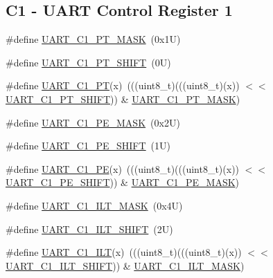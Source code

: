 \subsection*{C1 -\/ U\+A\+RT Control Register 1}
\begin{DoxyCompactItemize}
\item 
\#define \mbox{\hyperlink{group___u_a_r_t___register___masks_ga5a1c05b549b94de9232fbac665b3f584}{U\+A\+R\+T\+\_\+\+C1\+\_\+\+P\+T\+\_\+\+M\+A\+SK}}~(0x1\+U)
\item 
\#define \mbox{\hyperlink{group___u_a_r_t___register___masks_ga1638e7faa5063dab6afd34353fde4c89}{U\+A\+R\+T\+\_\+\+C1\+\_\+\+P\+T\+\_\+\+S\+H\+I\+FT}}~(0\+U)
\item 
\#define \mbox{\hyperlink{group___u_a_r_t___register___masks_gaf1c2f3c8a89397e4ccce509a2800250a}{U\+A\+R\+T\+\_\+\+C1\+\_\+\+PT}}(x)~(((uint8\+\_\+t)(((uint8\+\_\+t)(x)) $<$$<$ \mbox{\hyperlink{group___u_a_r_t___register___masks_ga1638e7faa5063dab6afd34353fde4c89}{U\+A\+R\+T\+\_\+\+C1\+\_\+\+P\+T\+\_\+\+S\+H\+I\+FT}})) \& \mbox{\hyperlink{group___u_a_r_t___register___masks_ga5a1c05b549b94de9232fbac665b3f584}{U\+A\+R\+T\+\_\+\+C1\+\_\+\+P\+T\+\_\+\+M\+A\+SK}})
\item 
\#define \mbox{\hyperlink{group___u_a_r_t___register___masks_ga0204f696872c2e5f92413bb11d0170d1}{U\+A\+R\+T\+\_\+\+C1\+\_\+\+P\+E\+\_\+\+M\+A\+SK}}~(0x2\+U)
\item 
\#define \mbox{\hyperlink{group___u_a_r_t___register___masks_ga1113f7bea6e6612fcc04db049d41cd1e}{U\+A\+R\+T\+\_\+\+C1\+\_\+\+P\+E\+\_\+\+S\+H\+I\+FT}}~(1\+U)
\item 
\#define \mbox{\hyperlink{group___u_a_r_t___register___masks_ga5aa3c8b737df2a5511d41513d4e4533f}{U\+A\+R\+T\+\_\+\+C1\+\_\+\+PE}}(x)~(((uint8\+\_\+t)(((uint8\+\_\+t)(x)) $<$$<$ \mbox{\hyperlink{group___u_a_r_t___register___masks_ga1113f7bea6e6612fcc04db049d41cd1e}{U\+A\+R\+T\+\_\+\+C1\+\_\+\+P\+E\+\_\+\+S\+H\+I\+FT}})) \& \mbox{\hyperlink{group___u_a_r_t___register___masks_ga0204f696872c2e5f92413bb11d0170d1}{U\+A\+R\+T\+\_\+\+C1\+\_\+\+P\+E\+\_\+\+M\+A\+SK}})
\item 
\#define \mbox{\hyperlink{group___u_a_r_t___register___masks_ga52e0789bf5650788a4ecbed75cd2b3d3}{U\+A\+R\+T\+\_\+\+C1\+\_\+\+I\+L\+T\+\_\+\+M\+A\+SK}}~(0x4\+U)
\item 
\#define \mbox{\hyperlink{group___u_a_r_t___register___masks_ga6066d98a54cf4ba19f40a196a0bd3ee0}{U\+A\+R\+T\+\_\+\+C1\+\_\+\+I\+L\+T\+\_\+\+S\+H\+I\+FT}}~(2\+U)
\item 
\#define \mbox{\hyperlink{group___u_a_r_t___register___masks_ga1598f03dbad6c945f32558c959ac6395}{U\+A\+R\+T\+\_\+\+C1\+\_\+\+I\+LT}}(x)~(((uint8\+\_\+t)(((uint8\+\_\+t)(x)) $<$$<$ \mbox{\hyperlink{group___u_a_r_t___register___masks_ga6066d98a54cf4ba19f40a196a0bd3ee0}{U\+A\+R\+T\+\_\+\+C1\+\_\+\+I\+L\+T\+\_\+\+S\+H\+I\+FT}})) \& \mbox{\hyperlink{group___u_a_r_t___register___masks_ga52e0789bf5650788a4ecbed75cd2b3d3}{U\+A\+R\+T\+\_\+\+C1\+\_\+\+I\+L\+T\+\_\+\+M\+A\+SK}})
$$
\end{DoxyCompactItemize}

